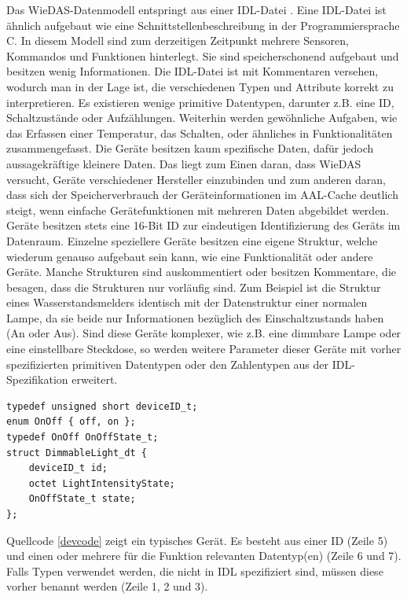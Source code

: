 Das WieDAS-Datenmodell entspringt aus einer IDL-Datei \cite{wiedas_idl}.
Eine IDL-Datei ist ähnlich aufgebaut wie eine Schnittstellenbeschreibung in der Programmiersprache C.
In diesem Modell sind zum derzeitigen Zeitpunkt mehrere Sensoren, Kommandos und Funktionen hinterlegt.
Sie sind speicherschonend aufgebaut und besitzen wenig Informationen.
Die IDL-Datei ist mit Kommentaren versehen, wodurch man in der Lage ist, die verschiedenen Typen und Attribute
korrekt zu interpretieren.
Es existieren wenige primitive Datentypen, darunter z.B. eine ID, Schaltzustände oder Aufzählungen.
Weiterhin werden gewöhnliche Aufgaben, wie das Erfassen einer Temperatur, das Schalten, oder ähnliches
in Funktionalitäten zusammengefasst.
Die Geräte besitzen kaum spezifische Daten, dafür jedoch aussagekräftige kleinere Daten.
Das liegt zum Einen daran, dass WieDAS versucht, Geräte verschiedener Hersteller einzubinden und zum
anderen daran, dass sich der Speicherverbrauch der Geräteinformationen im AAL-Cache deutlich steigt,
wenn einfache Gerätefunktionen mit mehreren Daten abgebildet werden.
Geräte besitzen stets eine 16-Bit ID zur eindeutigen Identifizierung des Geräts im Datenraum.
Einzelne speziellere Geräte besitzen eine eigene Struktur, welche wiederum genauso aufgebaut sein
kann, wie eine Funktionalität oder andere Geräte.
Manche Strukturen sind auskommentiert oder besitzen Kommentare, die besagen, dass die Strukturen
nur vorläufig sind.
Zum Beispiel ist die Struktur eines Wasserstandsmelders identisch mit der Datenstruktur einer
normalen Lampe, da sie beide nur Informationen bezüglich des Einschaltzustands haben (An oder Aus).
Sind diese Geräte komplexer, wie z.B. eine dimmbare Lampe oder eine einstellbare Steckdose, so werden
weitere Parameter dieser Geräte mit vorher spezifizierten primitiven Datentypen oder den
Zahlentypen aus der IDL-Spezifikation erweitert.

\begin{absolutelynopagebreak}
\lstset{language=IDL}
\begin{lstlisting}[frame=single,caption={Gerätebeschreibung eines dimmbaren Lichts in WieDAS},label={devcode}]
typedef unsigned short deviceID_t;
enum OnOff { off, on };
typedef OnOff OnOffState_t;
struct DimmableLight_dt {
	deviceID_t id;
	octet LightIntensityState;
	OnOffState_t state;
};
\end{lstlisting}
Quellcode \ref{devcode} zeigt ein typisches Gerät.
Es besteht aus einer ID (Zeile 5) und einen oder mehrere für die Funktion relevanten Datentyp(en) (Zeile 6 und 7).
Falls Typen verwendet werden, die nicht in IDL spezifiziert sind, müssen diese vorher benannt werden (Zeile 1, 2 und 3).

\end{absolutelynopagebreak}

